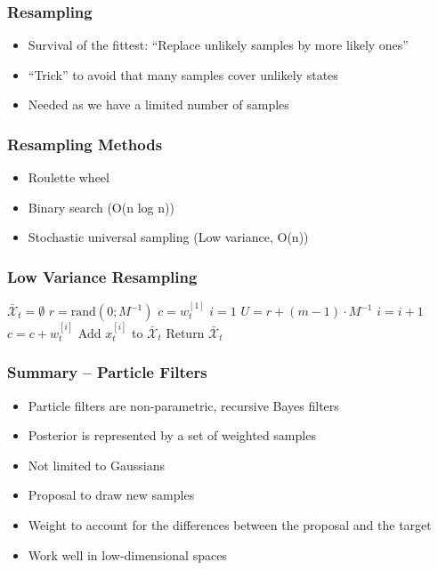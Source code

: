     \begin{frame}
    \frametitle{Resampling}
    \begin{itemize}
        \item Survival of the fittest: “Replace unlikely samples by more likely ones”
        \item “Trick” to avoid that many samples cover unlikely states
        \item Needed as we have a limited number of samples
    \end{itemize}
    \end{frame}
    
    \begin{frame}
    \frametitle{Resampling Methods}
    \begin{itemize}
        \item Roulette wheel
        \item Binary search (O(n log n))
        \item Stochastic universal sampling (Low variance, O(n))
    \end{itemize}
    \end{frame}
    
    \begin{frame}
    \frametitle{Low Variance Resampling}
    \begin{algorithmic}[1]
    \State $\bar{\mathcal{X}}_t = \emptyset$
    \State $r = \text{rand}(0; M^{-1})$
    \State $c = w_t^{[1]}$
    \State $i = 1$
        \State $U = r + (m - 1) \cdot M^{-1}$
            \State $i = i + 1$
            \State $c = c + w_t^{[i]}$
        \EndWhile
        \State Add $x_t^{[i]}$ to $\bar{\mathcal{X}}_t$
    \EndFor
    \State Return $\bar{\mathcal{X}}_t$
    \end{algorithmic}
    \end{frame}
    
    \begin{frame}
    \frametitle{Summary – Particle Filters}
    \begin{itemize}
        \item Particle filters are non-parametric, recursive Bayes filters
        \item Posterior is represented by a set of weighted samples
        \item Not limited to Gaussians
        \item Proposal to draw new samples
        \item Weight to account for the differences between the proposal and the target
        \item Work well in low-dimensional spaces
    \end{itemize}
    \end{frame}
    
